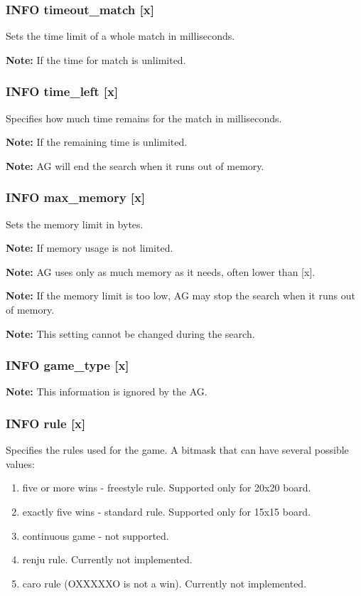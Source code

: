 \documentclass[12pt,a4paper]{article}
\begin{document}
\subsubsection{INFO timeout{\_}match [x]}
\label{cmd_timeout_match}
Sets the time limit of a whole match in milliseconds.

\textbf{Note:} If  the time for match is unlimited.

\subsubsection{INFO time{\_}left [x]}
\label{cmd_info_time_left}
Specifies how much time remains for the match in milliseconds.

\textbf{Note:} If  the remaining time is unlimited.

\textbf{Note:} AG will end the search when it runs out of memory.

\subsubsection{INFO max{\_}memory [x]}
\label{cmd_info_max_memory}
Sets the memory limit in bytes.

\textbf{Note:} If  memory usage is not limited.

\textbf{Note:} AG uses only as much memory as it needs, often lower than [x].

\textbf{Note:} If the memory limit is too low, AG may stop the search when it runs out of memory.

\textbf{Note:} This setting cannot be changed during the search.

\subsubsection{INFO game{\_}type [x]}
\label{cmd_info_game_type}
\textbf{Note:} This information is ignored by the AG.

\subsubsection{INFO rule [x]}
\label{cmd_info_rule}
Specifies the rules used for the game. A bitmask that can have several possible values:
\begin{enumerate}[leftmargin=7.5em]
	\item[\text{$[x]=0$}]{five or more wins - freestyle rule. Supported only for 20x20 board.}
	\item[\text{$[x]=1$}]{exactly five wins - standard rule. Supported only for 15x15 board.}
	\item[\text{$[x]=2$}]{continuous game - not supported.}
	\item[\text{$[x]=4$}]{renju rule. Currently not implemented.}
	\item[\text{$[x]=8$}]{caro rule (OXXXXXO is not a win). Currently not implemented.}
\end{enumerate}
\end{document}
